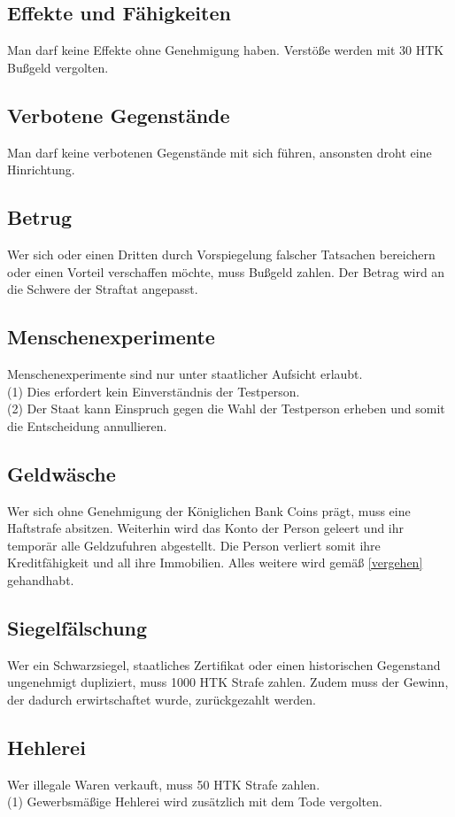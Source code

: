 \documentclass{article}
\begin{document}
\subsection{Effekte und Fähigkeiten}
Man darf keine Effekte ohne Genehmigung haben. Verstöße werden mit 30 HTK Bußgeld vergolten.

\subsection{Verbotene Gegenstände}
Man darf keine verbotenen Gegenstände mit sich führen, ansonsten droht eine Hinrichtung.

\subsection{Betrug}
Wer sich oder einen Dritten durch Vorspiegelung falscher Tatsachen bereichern oder einen Vorteil verschaffen möchte, muss Bußgeld zahlen. Der Betrag wird an die Schwere der Straftat angepasst.

\subsection{Menschenexperimente}
Menschenexperimente sind nur unter staatlicher Aufsicht erlaubt.\\
(1) Dies erfordert kein Einverständnis der Testperson.\\
(2) Der Staat kann Einspruch gegen die Wahl der Testperson erheben und somit die Entscheidung annullieren.

\subsection{Geldwäsche}
Wer sich ohne Genehmigung der Königlichen Bank Coins prägt, muss eine Haftstrafe absitzen. Weiterhin wird das Konto der Person geleert und ihr temporär alle Geldzufuhren abgestellt. Die Person verliert somit ihre Kreditfähigkeit und all ihre Immobilien. Alles weitere wird gemäß \ref{vergehen} gehandhabt.

\subsection{Siegelfälschung}
Wer ein Schwarzsiegel, staatliches Zertifikat oder einen historischen Gegenstand ungenehmigt dupliziert, muss 1000 HTK Strafe zahlen. Zudem muss der Gewinn, der dadurch erwirtschaftet wurde, zurückgezahlt werden.

\subsection{Hehlerei}
Wer illegale Waren verkauft, muss 50 HTK Strafe zahlen.\\
(1) Gewerbsmäßige Hehlerei wird zusätzlich mit dem Tode vergolten.
\end{document}
